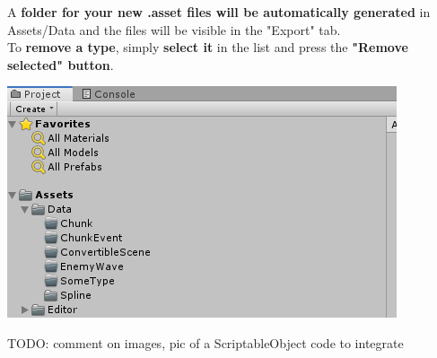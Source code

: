 \documentclass[10pt,a4paper]{article}
\begin{document}
\newpage
\noindent A \textbf{folder for your new .asset files will be automatically generated} in Assets/Data and the files will be visible in the "Export" tab.\\
To \textbf{remove a type}, simply \textbf{select it} in the list and press the \textbf{"Remove selected" button}.
\begin{center}
\includegraphics[scale=1.0]{dataFolder}
\end{center}

TODO: comment on images, pic of a ScriptableObject code to integrate
\end{document}
